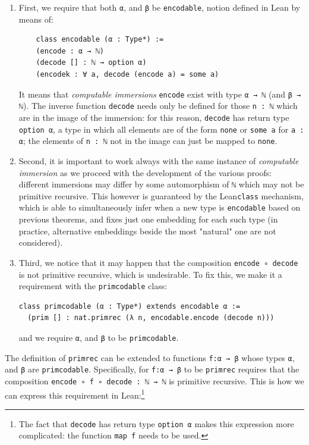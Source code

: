 \documentclass[preprint]{elsarticle}
\theoremstyle{remark}
\newcommand{\LEAN}{\textsf{Lean}\xspace}
\begin{document}
\begin{enumerate}
\item
First, we require that both \lstinline|α|, and \lstinline|β| be \lstinline|encodable|, notion defined in \LEAN by means of:

\begin{lstlisting}
    class encodable (α : Type*) :=
    (encode : α → ℕ)
    (decode [] : ℕ → option α)
    (encodek : ∀ a, decode (encode a) = some a)
\end{lstlisting}
It means that \emph{computable immersions} \lstinline|encode| exist with type \lstinline|α → ℕ| (and \lstinline|β → ℕ|). The inverse function \lstinline|decode| needs only be defined for those \lstinline|n : ℕ| which are in the image of the immersion: for this reason, \lstinline|decode| has return type \lstinline|option α|, a type in which all elements are of the form \lstinline|none| or \lstinline|some a| for \lstinline|a : α|; the elements of \lstinline|n : ℕ| not in the image can just be mapped to \lstinline|none|.

\item
Second, it is important to work always with the same instance of \emph{computable immersion} as we proceed with the development of the various proofs: different immersions may differ by some automorphism of \lstinline|ℕ| which may not be primitive recursive. This however is guaranteed by the \LEAN \lstinline|class| mechanism, which is able to simultaneously infer when a new type is \lstinline|encodable| based on previous theorems, and fixes just one embedding for each such type (in practice, alternative embeddings beside the most "natural" one are not considered).

\item
Third, we notice that it may happen that the composition \lstinline|encode ∘ decode| is not primitive recursive, which is undesirable.
To fix this, we make it a requirement with the \lstinline|primcodable| class:

\begin{lstlisting}
class primcodable (α : Type*) extends encodable α :=
  (prim [] : nat.primrec (λ n, encodable.encode (decode n)))
\end{lstlisting}
\noindent
and we require \lstinline|α|, and \lstinline|β| to be \lstinline|primcodable|.
\end{enumerate}

The definition of \lstinline|primrec| can be extended to functions \lstinline|f:α → β| whose types \lstinline|α|, and \lstinline|β| are \lstinline|primcodable|. Specifically, for \lstinline|f:α → β| to be \lstinline|primrec| requires that the composition \lstinline|encode ∘ f ∘ decode : ℕ → ℕ| is primitive recursive. This is how we can express this requirement in \LEAN:\footnote{The fact that \lstinline|decode| has return type \lstinline|option α| makes this expression more complicated: the function \lstinline|map f| needs to be used.}
\end{document}
